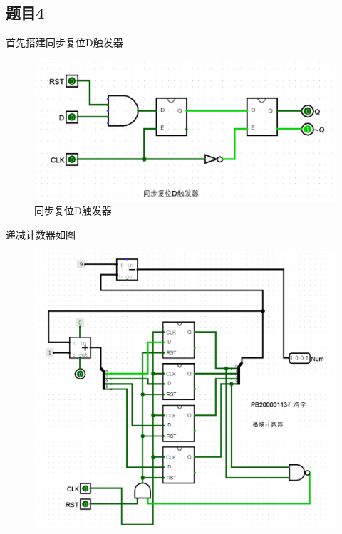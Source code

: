 \documentclass{article}
\begin{document}
    \subsection*{题目4}	
    首先搭建同步复位D触发器
    \begin{figure}[htbp]
        \centering
        \includegraphics[scale=0.8]{t40.png}
        \caption*{同步复位D触发器}
    \end{figure}
    \clearpage
    递减计数器如图
    \begin{figure}[htbp]
        \centering
        \includegraphics[scale=0.55]{t4.png}
    \end{figure}
\end{document}
